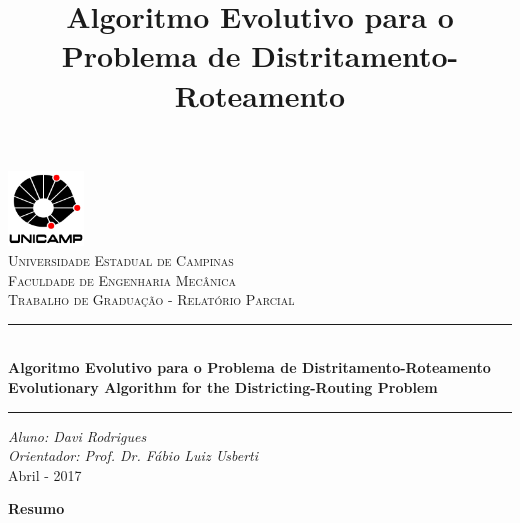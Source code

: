 \documentclass[12pt]{elsarticle}
\newcommand{\HRule}{\rule{\linewidth}{0.5mm}}
\begin{document}
	
	
	
    
    \title{Algoritmo Evolutivo para o Problema de Distritamento-Roteamento}
	
	\begin{titlepage}
	\begin{center}
		\includegraphics[width=0.15\textwidth]{LogoUnicamp.png}\\[1cm]
		\textsc{\large Universidade Estadual de Campinas}\\[0.25cm]
		\textsc{\large Faculdade de Engenharia Mecânica}\\[2.0cm]
		\textsc{\Large Trabalho de Graduação - Relatório Parcial} \\ [2.0cm]
		\HRule \\[1.5cm]
		{ \bfseries \Large Algoritmo Evolutivo para o Problema de Distritamento-Roteamento}\\[1.5cm]
		{ \bfseries \Large Evolutionary Algorithm for the Districting-Routing Problem}\\[1.5cm]
		\HRule %
		
		\vfill
		
		\large \emph{Aluno: Davi Rodrigues} \\
		\large \emph{Orientador: Prof. Dr. Fábio Luiz Usberti}\\
		
		\vfill
		{\large Abril - 2017}
	\end{center}
\end{titlepage}
	
	\newpage
	
	\renewcommand{\contentsname}{\centering Sumário}
	\tableofcontents
	
	\newpage
	
	\setcounter{page}{1}
	
	\begin{center}
		\textbf{Resumo} \label{sec:Resumo}
	\end{center}
    
\end{document}
